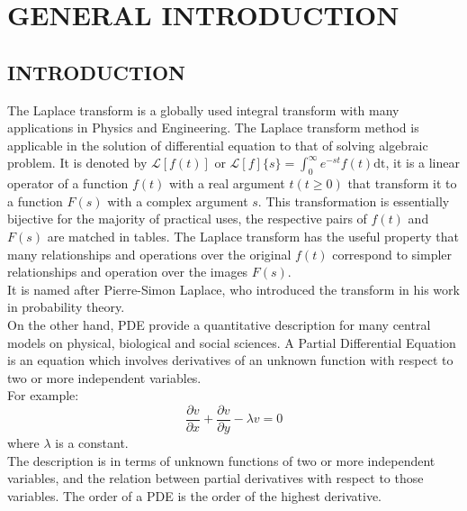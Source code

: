\documentclass[11pt]{report}
\newcommand{\Laplace}{\mathcal{L}}
\newcommand{\ft}{f(t)}
\newcommand{\Fs}{F(s)}
\newcommand{\LaplaceIntegral}{\int_{0}^{\infty}e^{-st}\ft\text{dt}}
\newcommand{\sbracket}[1]{\left[#1\right]}
\newcommand{\LFt}{\Laplace \sbracket{\ft}}
\newcommand{\NI}{\noindent}
\newcommand{\LFn}[1]{\Laplace \sbracket{#1}}
\newcommand{\sps}{\\[0.2cm]}
\newcommand{\dsp}{\displaystyle}
\newcommand{\PDe}{Partial Differential Equation }
\newcommand{\PDE}{PDE }
\begin{document}
	\newpage
	\tableofcontents
	
	\newpage
	\chapter{GENERAL INTRODUCTION}
	
	\section{INTRODUCTION}
	The Laplace transform is a globally used integral transform with many applications in Physics and Engineering. The Laplace transform method is applicable in the solution of differential equation to that of solving algebraic problem. It is denoted by $\LFt$ or $\dsp\LFn{f}\{s\} = \LaplaceIntegral$, it is a linear operator of a function $\ft$ with a real argument $t(t\geq 0)$ that transform it to a function $\Fs$ with a complex argument $s$. This transformation is essentially bijective for the majority of practical uses, the respective pairs of $\ft$ and $\Fs$ are matched in tables. The Laplace transform has the useful property that many relationships and operations over the original $\ft$ correspond to simpler relationships and operation over the images $\Fs$.\\
	
	\NI It is named after Pierre-Simon Laplace, who introduced the transform in his work in probability theory. \\

	\NI On the other hand, PDE provide a quantitative description for many central models on physical, biological and social sciences. A \PDe is an equation which involves derivatives of an unknown function with respect to two or more independent variables.\sps
	For example:
	\begin{equation}
		\frac{\partial v}{\partial x} + \frac{\partial v}{\partial y} - \lambda v = 0
		\label{eq:1_1}
	\end{equation}
	where $\lambda$ is a constant.\sps
	
	The description is in terms of unknown functions of two or more independent variables, and the relation between partial derivatives with respect to those variables. The order of a \PDE is the order of the highest derivative.\\
	
\end{document}
